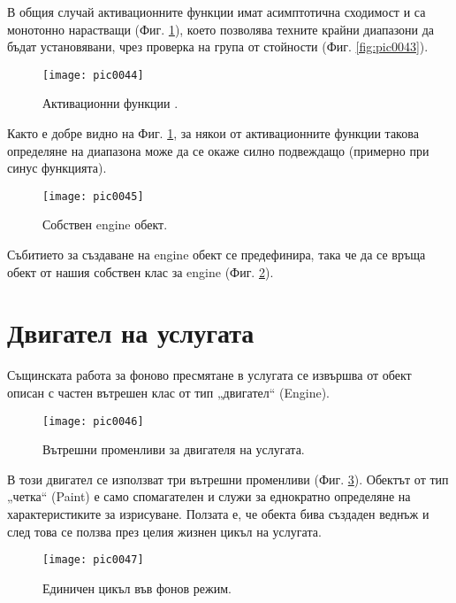 В общия случай активационните функции имат асимптотична сходимост и са монотонно нарастващи (Фиг. \ref{fig:pic0044}), което позволява техните крайни диапазони да бъдат установявани, чрез проверка на група от стойности (Фиг. \ref{fig:pic0043}).

\begin{figure}[h]
  \centering
  \texttt{[image: pic0044]}
  \caption{Активационни функции \cite{afwiki}.}
\label{fig:pic0044}
\end{figure}
\FloatBarrier

Както е добре видно на Фиг. \ref{fig:pic0044}, за някои от активационните функции такова определяне на диапазона може да се окаже силно подвеждащо (примерно при синус функцията). 

\begin{figure}[h]
  \centering
  \texttt{[image: pic0045]}
  \caption{Собствен engine обект.}
\label{fig:pic0045}
\end{figure}
\FloatBarrier

Събитието за създаване на engine обект се предефинира, така че да се връща обект от нашия собствен клас за engine (Фиг. \ref{fig:pic0045}). 

\section{Двигател на услугата}

Същинската работа за фоново пресмятане в услугата се извършва от обект описан с частен вътрешен клас от тип „двигател“ (Engine).

\begin{figure}[h]
  \centering
  \texttt{[image: pic0046]}
  \caption{Вътрешни променливи за двигателя на услугата.}
\label{fig:pic0046}
\end{figure}
\FloatBarrier

В този двигател се използват три вътрешни променливи (Фиг. \ref{fig:pic0046}). Обектът от тип „четка“ (Paint) е само спомагателен и служи за еднократно определяне на характеристиките за изрисуване. Ползата е, че обекта бива създаден веднъж и след това се ползва през целия жизнен цикъл на услугата. 

\begin{figure}[h]
  \centering
  \texttt{[image: pic0047]}
  \caption{Единичен цикъл във фонов режим.}
\label{fig:pic0047}
\end{figure}
\FloatBarrier

